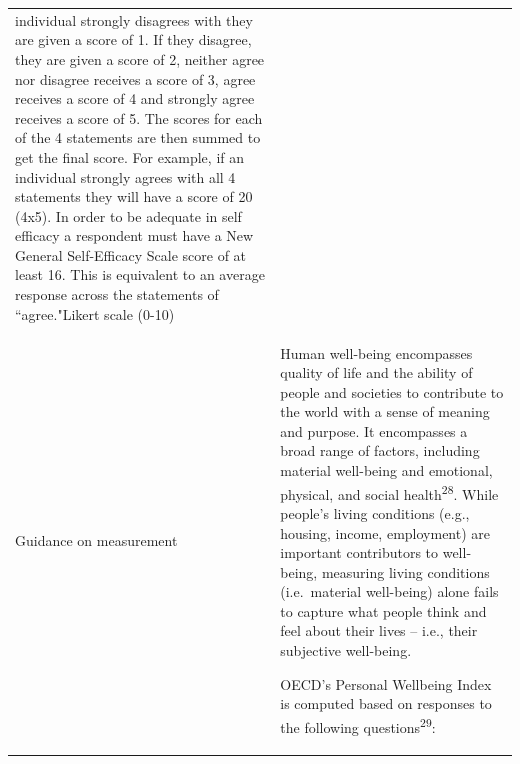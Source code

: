 \documentclass[
  letterpaper,
  DIV=11,
  numbers=noendperiod]{scrreprt}
\begin{document}
\begin{longtable}[]{@{}
  >{\raggedright\arraybackslash}p{}
  >{\raggedright\arraybackslash}p{}@{}}
\begin{minipage}[t]{\linewidth}
{individual strongly disagrees with they are given a score of 1. If they
disagree, they are given a score of 2, neither agree nor disagree
receives a score of 3, agree receives a score of 4 and strongly agree
receives a score of 5. The scores for each of the 4 statements are then
summed to get the final score. For example, if an individual strongly
agrees with all 4 statements they will have a score of 20 (4x5). In
order to be adequate in self efficacy a respondent must have a New
General Self-Efficacy Scale score of at least 16. This is equivalent to
an average response across the statements of ``agree."}Likert scale
(0-10)\label{63}{\label{64}{\label{65}{}}}\strut
\end{minipage} \\
Guidance on measurement & \begin{minipage}[t]{\linewidth}\raggedright
Human well-being encompasses quality of life and the ability of people
and societies to contribute to the world with a sense of meaning and
purpose. It encompasses a broad range of factors, including material
well-being and emotional, physical, and social
health\textsuperscript{28}. While people's living conditions (e.g.,
housing, income, employment) are important contributors to well-being,
measuring living conditions (i.e.~material well-being) alone fails to
capture what people think and feel about their lives -- i.e., their
subjective well-being.

OECD's Personal Wellbeing Index is computed based on responses to the
following questions\textsuperscript{29}:


\end{minipage}
\end{longtable}
\end{document}
